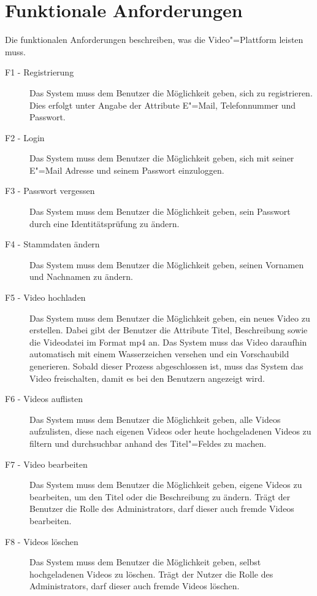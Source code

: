 \section{Funktionale Anforderungen}

Die funktionalen Anforderungen beschreiben, was die Video"=Plattform leisten muss.

\begin{description}
   \item[F1 - Registrierung] Das System muss dem Benutzer die Möglichkeit geben, sich zu registrieren. Dies erfolgt unter Angabe der Attribute E"=Mail, Telefonnummer und Passwort. \label{F1}
   \item[F2 - Login] Das System muss dem Benutzer die Möglichkeit geben, sich mit seiner E"=Mail Adresse und seinem Passwort einzuloggen. \label{F2}
   \item[F3 - Passwort vergessen] Das System muss dem Benutzer die Möglichkeit geben, sein Passwort durch eine Identitätsprüfung zu ändern. \label{F3}
   \item[F4 - Stammdaten ändern] Das System muss dem Benutzer die Möglichkeit geben, seinen Vornamen und Nachnamen zu ändern. \label{F4}
   \item[F5 - Video hochladen] Das System muss dem Benutzer die Möglichkeit geben, ein neues Video zu erstellen. Dabei gibt der Benutzer die Attribute Titel, Beschreibung sowie die Videodatei im Format mp4 an. Das System muss das Video daraufhin automatisch mit einem Wasserzeichen versehen und ein Vorschaubild generieren. Sobald dieser Prozess abgeschlossen ist, muss das System das Video freischalten, damit es bei den Benutzern angezeigt wird. \label{F5}
   \item[F6 - Videos auflisten] Das System muss dem Benutzer die Möglichkeit geben, alle Videos aufzulisten, diese nach eigenen Videos oder heute hochgeladenen Videos zu filtern und durchsuchbar anhand des Titel"=Feldes zu machen. \label{F6}
   \item[F7 - Video bearbeiten] Das System muss dem Benutzer die Möglichkeit geben, eigene Videos zu bearbeiten, um den Titel oder die Beschreibung zu ändern. Trägt der Benutzer die Rolle des Administrators, darf dieser auch fremde Videos bearbeiten. \label{F7}
   \item[F8 - Videos löschen] Das System muss dem Benutzer die Möglichkeit geben, selbst hochgeladenen Videos zu löschen. Trägt der Nutzer die Rolle des Administrators, darf dieser auch fremde Videos löschen. \label{F8}
\end{description}